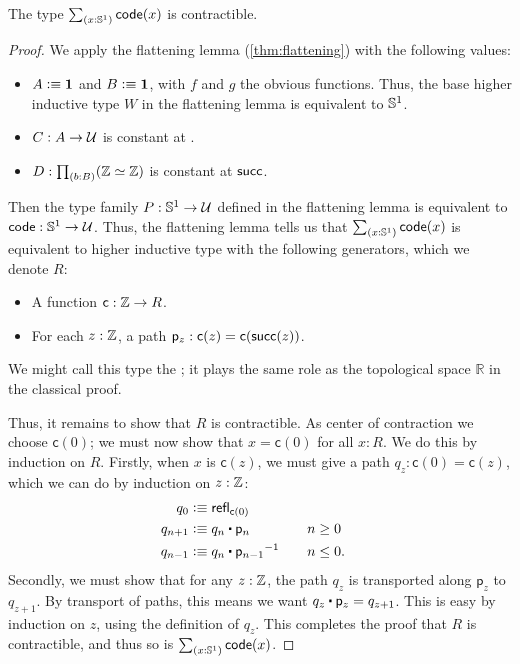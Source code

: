 \begin{lem}
  The type $\sm{x:\Sn^1}\code(x)$ is contractible.
\end{lem}
\begin{proof}
  We apply the flattening lemma (\autoref{thm:flattening}) with the following values:
  \begin{itemize}
  \item $A\vcentcolon\equiv\mathbf{1}$ and $B\vcentcolon\equiv\mathbf{1}$, with $f$ and $g$ the obvious functions.
    Thus, the base higher inductive type $W$ in the flattening lemma is equivalent to $\mathbb{S}^1$.
  \item $C:A\to\mathcal{U}$ is constant at \Z.
  \item $D:\prd{b:B} (\eqv{\Z}{\Z})$ is constant at $\mathsf{succ}$.
  \end{itemize}
  Then the type family $P:\mathbb{S}^1\to\mathcal{U}$ defined in the flattening lemma is equivalent to $\mathsf{code}:\mathbb{S}^1\to\mathcal{U}$.
  Thus, the flattening lemma tells us that $\sm{x:\Sn^1}\code(x)$ is equivalent to higher inductive type with the following generators, which we denote $R$:
  \begin{itemize}
  \item A function $\mathsf{c}: \mathbb{Z} \to R$.
  \item For each $z:\mathbb{Z}$, a path $\mathsf{p}_z:\mathsf{c}(z) = \mathsf{c}(\mathsf{succ}(z))$.
  \end{itemize}
  We might call this type the ; it plays the same role as the topological space $\mathbb{R}$ in the classical proof.

  Thus, it remains to show that $R$ is contractible.
  As center of contraction we choose $\mathsf{c}(0)$; we must now show that $x=\mathsf{c}(0)$ for all $x:R$.
  We do this by induction on $R$.
  Firstly, when $x$ is $\mathsf{c}(z)$, we must give a path $q_z:\mathsf{c}(0) = \mathsf{c}(z)$, which we can do by induction on $z:\mathbb{Z}$:
  \begin{alignat*}{2}
    q_0 &\defeq \refl{\mathsf{c}(0)}\\
    q_{n+1} &\defeq q_n \ct \mathsf{p}_n && \quad n\ge 0\\
    q_{n-1} &\defeq q_n \ct \opp{\mathsf{p}_{n-1}} && \quad n\le 0.
  \end{alignat*}
  Secondly, we must show that for any $z:\mathbb{Z}$, the path $q_z$ is transported along $\mathsf{p}_z$ to $q_{z+1}$.
  By transport of paths, this means we want $q_z \ct \mathsf{p}_z = q_{z+1}$.
  This is easy by induction on $z$, using the definition of $q_z$.
  This completes the proof that $R$ is contractible, and thus so is $\sm{x:\Sn^1}\code(x)$.
\end{proof}

